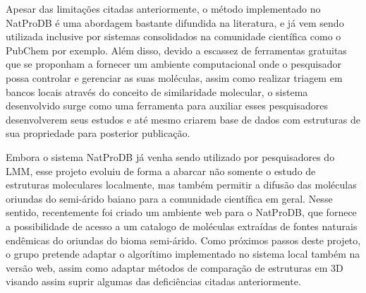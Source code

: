 Apesar das limitações citadas anteriormente, o método implementado no NatProDB é uma abordagem bastante difundida na literatura, e já vem sendo utilizada inclusive por sistemas consolidados na comunidade científica como o PubChem por exemplo. Além disso, devido a escassez de ferramentas gratuitas que se proponham a fornecer um ambiente computacional onde o pesquisador possa controlar e gerenciar as suas moléculas, assim como realizar triagem em bancos locais através do conceito de similaridade molecular, o sistema desenvolvido surge como uma ferramenta para auxiliar esses pesquisadores desenvolverem seus estudos e até mesmo criarem  base de dados com estruturas de sua propriedade para posterior publicação.

Embora o sistema NatProDB já venha sendo utilizado por pesquisadores do LMM, esse projeto evoluiu de forma a abarcar não somente o estudo de estruturas moleculares localmente, mas também permitir a difusão das moléculas oriundas do semi-árido baiano para a comunidade científica em geral. Nesse sentido, recentemente foi criado um ambiente web para o NatProDB, que fornece a possibilidade de acesso a um catalogo de moléculas extraídas de fontes naturais endêmicas do oriundas  do bioma semi-árido. Como próximos passos deste projeto, o grupo pretende adaptar o algorítimo implementado no sistema local também na versão web, assim como adaptar métodos de comparação de estruturas em 3D visando assim suprir algumas das deficiências citadas anteriormente.     
     

  